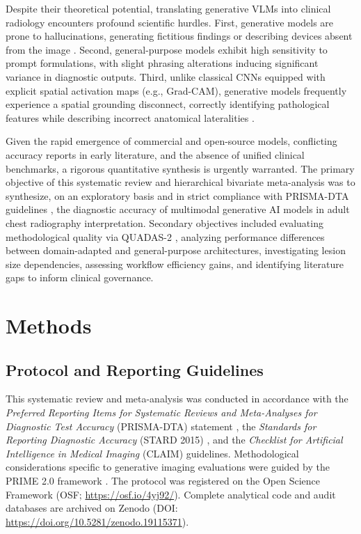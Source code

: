 \documentclass[preprint,11pt]{elsarticle}
\begin{document}
Despite their theoretical potential, translating generative VLMs into clinical radiology encounters profound scientific hurdles. First, generative models are prone to hallucinations, generating fictitious findings or describing devices absent from the image \cite{ostrovsky,banerjee}. Second, general-purpose models exhibit high sensitivity to prompt formulations, with slight phrasing alterations inducing significant variance in diagnostic outputs. Third, unlike classical CNNs equipped with explicit spatial activation maps (e.g., Grad-CAM), generative models frequently experience a spatial grounding disconnect, correctly identifying pathological features while describing incorrect anatomical lateralities \cite{hong2025b}.

Given the rapid emergence of commercial and open-source models, conflicting accuracy reports in early literature, and the absence of unified clinical benchmarks, a rigorous quantitative synthesis is urgently warranted. The primary objective of this systematic review and hierarchical bivariate meta-analysis was to synthesize, on an exploratory basis and in strict compliance with PRISMA-DTA guidelines \cite{mcinnes}, the diagnostic accuracy of multimodal generative AI models in adult chest radiography interpretation. Secondary objectives included evaluating methodological quality via QUADAS-2 \cite{whiting}, analyzing performance differences between domain-adapted and general-purpose architectures, investigating lesion size dependencies, assessing workflow efficiency gains, and identifying literature gaps to inform clinical governance.

\section{Methods}

\subsection{Protocol and Reporting Guidelines}
This systematic review and meta-analysis was conducted in accordance with the \textit{Preferred Reporting Items for Systematic Reviews and Meta-Analyses for Diagnostic Test Accuracy} (PRISMA-DTA) statement \cite{mcinnes}, the \textit{Standards for Reporting Diagnostic Accuracy} (STARD 2015) \cite{stard}, and the \textit{Checklist for Artificial Intelligence in Medical Imaging} (CLAIM) guidelines. Methodological considerations specific to generative imaging evaluations were guided by the PRIME 2.0 framework \cite{kagiyama}. The protocol was registered on the Open Science Framework (OSF; \url{https://osf.io/4yj92/}). Complete analytical code and audit databases are archived on Zenodo (DOI: \url{https://doi.org/10.5281/zenodo.19115371}).
\end{document}
